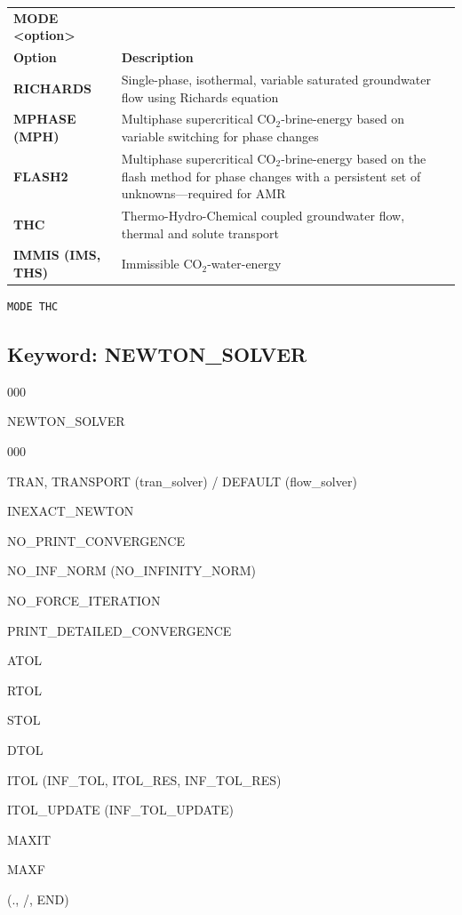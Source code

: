 \documentclass[12pt]{article}
\begin{document}
\begin{center}
\begin{tabularx}{\linewidth}{lX}
\bf MODE <option>\\
\bf Option & \bf Description\\
\bf RICHARDS &Single-phase, isothermal, variable saturated groundwater flow using Richards equation\\
\bf MPHASE (MPH) &Multiphase supercritical CO$_2$-brine-energy based on variable switching for phase changes\\
\bf FLASH2 &Multiphase supercritical CO$_2$-brine-energy based on the flash method for phase changes with a persistent set of unknowns---required for AMR\\
\bf THC &Thermo-Hydro-Chemical coupled groundwater flow, thermal and solute transport\\
\bf IMMIS (IMS, THS) &Immissible CO$_2$-water-energy\\
\end{tabularx}
\end{center}

\begin{verbatim}
MODE THC
\end{verbatim}


\newpage
\protect\hypertarget{target_newt}{}

\subsection{Keyword: NEWTON\_SOLVER}


\begin{deflist}{000}
\item[NEWTON\_SOLVER] ~
\begin{deflist}{000}
\item[TRAN, TRANSPORT (tran\_solver) / DEFAULT (flow\_solver)]
\item[INEXACT\_NEWTON]
\item[NO\_PRINT\_CONVERGENCE]
\item[NO\_INF\_NORM (NO\_INFINITY\_NORM)]
\item[NO\_FORCE\_ITERATION]
\item[PRINT\_DETAILED\_CONVERGENCE]
\item[ATOL]
\item[RTOL]
\item[STOL]
\item[DTOL]
\item[ITOL (INF\_TOL, ITOL\_RES, INF\_TOL\_RES)]
\item[ITOL\_UPDATE (INF\_TOL\_UPDATE)]
\item[MAXIT]
\item[MAXF]
\end{deflist}
\item[(., /, END)]
\end{deflist}
\end{document}
